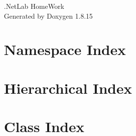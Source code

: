 \let\mypdfximage\pdfximage\def\pdfximage{\immediate\mypdfximage}\documentclass[twoside]{book}
\newcommand{\+}{\discretionary{\mbox{\scriptsize$\hookleftarrow$}}{}{}}
\newcommand{\clearemptydoublepage}{%
  \newpage{\pagestyle{empty}\cleardoublepage}%
}
\begin{document}
\hypersetup{pageanchor=false,
             bookmarksnumbered=true,
             pdfencoding=unicode
            }
\begin{titlepage}
\vspace*{7cm}
\begin{center}%
{\Large .Net\+Lab Home\+Work }\\
\vspace*{1cm}
{\large Generated by Doxygen 1.8.15}\\
\end{center}
\end{titlepage}
\clearemptydoublepage
{}
\tableofcontents
\clearemptydoublepage
{}
\hypersetup{pageanchor=true}

\chapter{Namespace Index}

\chapter{Hierarchical Index}

\chapter{Class Index}

\end{document}

